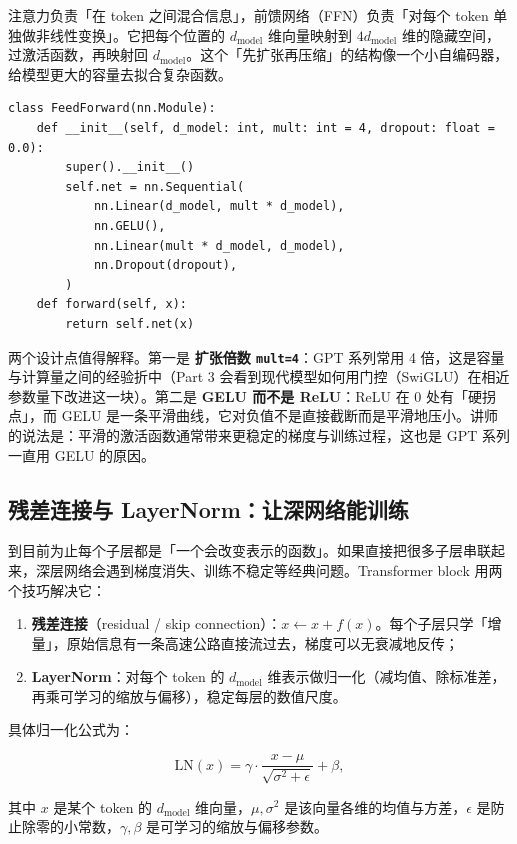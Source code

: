 注意力负责「在 token 之间混合信息」，前馈网络（FFN）负责「对每个 token 单独做非线性变换」。它把每个位置的 $d_{\text{model}}$ 维向量映射到 $4d_{\text{model}}$ 维的隐藏空间，过激活函数，再映射回 $d_{\text{model}}$。这个「先扩张再压缩」的结构像一个小自编码器，给模型更大的容量去拟合复杂函数。

\begin{lstlisting}[caption={\texttt{part\_1/ffn.py}：带 GELU 的前馈网络}]
class FeedForward(nn.Module):
    def __init__(self, d_model: int, mult: int = 4, dropout: float = 0.0):
        super().__init__()
        self.net = nn.Sequential(
            nn.Linear(d_model, mult * d_model),
            nn.GELU(),
            nn.Linear(mult * d_model, d_model),
            nn.Dropout(dropout),
        )
    def forward(self, x):
        return self.net(x)
\end{lstlisting}

两个设计点值得解释。第一是 \textbf{扩张倍数 \texttt{mult=4}}：GPT 系列常用 4 倍，这是容量与计算量之间的经验折中（Part 3 会看到现代模型如何用门控（SwiGLU）在相近参数量下改进这一块）。第二是 \textbf{GELU 而不是 ReLU}：ReLU 在 0 处有「硬拐点」，而 GELU 是一条平滑曲线，它对负值不是直接截断而是平滑地压小。讲师的说法是：平滑的激活函数通常带来更稳定的梯度与训练过程，这也是 GPT 系列一直用 GELU 的原因。

\subsection{残差连接与 LayerNorm：让深网络能训练}

到目前为止每个子层都是「一个会改变表示的函数」。如果直接把很多子层串联起来，深层网络会遇到梯度消失、训练不稳定等经典问题。Transformer block 用两个技巧解决它：

\begin{enumerate}
\item \textbf{残差连接}（residual / skip connection）：$x \leftarrow x + f(x)$。每个子层只学「增量」，原始信息有一条高速公路直接流过去，梯度可以无衰减地反传；
\item \textbf{LayerNorm}：对每个 token 的 $d_{\text{model}}$ 维表示做归一化（减均值、除标准差，再乘可学习的缩放与偏移），稳定每层的数值尺度。
\end{enumerate}

具体归一化公式为：

$$
\mathrm{LN}(x)=\gamma\cdot\frac{x-\mu}{\sqrt{\sigma^2+\epsilon}}+\beta ,
$$

其中 $x$ 是某个 token 的 $d_{\text{model}}$ 维向量，$\mu,\sigma^2$ 是该向量各维的均值与方差，$\epsilon$ 是防止除零的小常数，$\gamma,\beta$ 是可学习的缩放与偏移参数。

